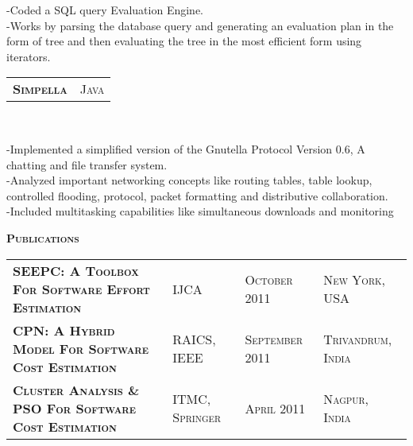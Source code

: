 \documentclass[10pt,a4paper,oneside]{article}
\begin{document}
     \vspace{-4mm}
    \begin{adjustwidth}{7pt}{0pt}
        {\footnotesize -Coded a SQL query Evaluation Engine.\\
        -Works by parsing the database query and generating an evaluation plan in the form of tree and then evaluating the tree in the most efficient form using iterators.}\\
    \end{adjustwidth}
    \vspace{-6pt}
    \begin{tabular}{c|c}
        \textbf{\normalsize S\textsc{impella}}
        &\textmd{\normalsize J\textsc{ava}}
    \end{tabular}\\
     \vspace{-4mm}
    \begin{adjustwidth}{7pt}{0pt}
        {\footnotesize -Implemented a simplified version of the
        Gnutella Protocol Version 0.6, A chatting and file transfer
        system.\\
        -Analyzed important networking concepts like routing tables, table lookup, controlled
        flooding, protocol, packet formatting and distributive
        collaboration.\\
        -Included multitasking capabilities like simultaneous
        downloads and monitoring}\\
    \end{adjustwidth}
    \vspace{-6pt}
    \textcolor{light-gray}{\textbf{\large P\textsc{ublications}}}
    \vspace{4pt}\\
    \begin{tabular}{llll}
        \textbf{\normalsize SEEPC: A T\textsc{oolbox}
        F\textsc{or} S\textsc{oftware} E\textsc{ffort}
        E\textsc{stimation}}
        &\textmd{\normalsize IJCA}
        &\textcolor{light-gray}{{\small O\textsc{ctober 2011}}}
        &\textcolor{light-gray}{{\small N\textsc{ew} Y\textsc{ork}, USA}}\\ 
        \textbf{\normalsize CPN: A H\textsc{ybrid}
        M\textsc{odel} F\textsc{or} S\textsc{oftware}
        C\textsc{ost} E\textsc{stimation}}
        &\textmd{\normalsize RAICS, IEEE}
        &\textcolor{light-gray}{{\small S\textsc{eptember 2011}}}
        &\textcolor{light-gray}{{\small T\textsc{rivandrum}, I\textsc{ndia}}}\\
        \textbf{\normalsize C\textsc{luster} A\textsc{nalysis} \& PSO F\textsc{or} S\textsc{oftware} C\textsc{ost} E\textsc{stimation}}
        &\textmd{\normalsize ITMC, S\textsc{pringer}}
        &\textcolor{light-gray}{{\small A\textsc{pril 2011}}}
        &\textcolor{light-gray}{{\small N\textsc{agpur}, I\textsc{ndia}}}\\
    \end{tabular}\\
\end{document}
